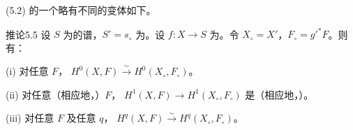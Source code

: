 (5.2) 的一个略有不同的变体如下。
\begin{SGAresult}{推论}{5.5}
设 $S$ 为的谱，$S'=s_\circ$ 为。设 $f:X\to S$ 为。令 $X_\circ=X'$，$F_\circ=g'^*F$。则有：

(i) 对任意 $F$，
$H^0(X,F)\xrightarrow{\sim}H^0(X_\circ,F_\circ)$。

(ii) 对任意（相应地，）$F$，
$H^1(X,F)\to H^1(X_\circ,F_\circ)$ 是（相应地，）。

(iii) 对任意 $F$ 及任意 $q$，
$H^q(X,F)\xrightarrow{\sim}H^q(X_\circ,F_\circ)$。
\end{SGAresult}
